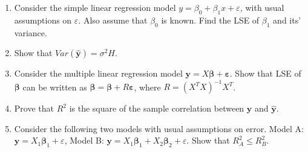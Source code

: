 \documentclass[12pt]{article}%
\begin{document}
\begin{enumerate}[leftmargin=*]
   \item Consider the simple linear regression model $y=\beta_0 + \beta_1 x +
      \varepsilon$, with usual assumptions on $\varepsilon$. Also assume that $\beta_0$ is
      known. Find the LSE of $\beta_1$ and its' variance.



   \item Show that $Var(\widehat{\boldsymbol{y}})=\sigma^2 H$.

   \item Consider the multiple linear regression model $\boldsymbol{y} = X
      \boldsymbol{\beta} + \boldsymbol{\varepsilon}$. Show that LSE of
      $\boldsymbol{\beta}$ can be written as $\widehat{\boldsymbol{\beta}} =
      \boldsymbol{\beta} + R \boldsymbol{\varepsilon}$, where $R=\left( X^T X
      \right)^{-1}X^T$.


   \item Prove that $R^2$ is the square of the sample correlation between
      $\boldsymbol{y}$ and $\widehat{\boldsymbol{y}}$.

   \item Consider the following two models with usual assumptions on error.
      Model A: $\boldsymbol{y} = X_1\boldsymbol{\beta}_1 + \varepsilon$,
      Model B: $\boldsymbol{y} = X_1\boldsymbol{\beta}_1 + X_2\boldsymbol{\beta}_2 +
      \varepsilon$.
      Show that $R^2_A\le R^2_B$.



\end{enumerate}
\end{document}
